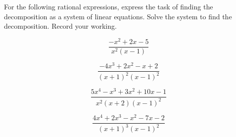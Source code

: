 \begin{reduce}
\begin{exercise}  
For the following rational expressions, express the task of finding the  decomposition as a system of linear equations.
Solve the system to find the decomposition.  
Record your working.
\begin{Parts}
\item 
\begin{equation*}
\frac{-x^2+2x-5}{x^2(x-1)}
\end{equation*}

\item 
\begin{equation*}
\frac{-4x^3+2x^2-x+2}{(x+1)^2(x-1)^2}
\end{equation*}

\item 
\begin{equation*}
\frac{5x^4-x^3+3x^2+10x-1}{x^2(x+2)(x-1)^2}
\end{equation*}


\item 
\begin{equation*}
\frac{4x^4+2x^3-x^2-7x-2}{(x+1)^3(x-1)^2}
\end{equation*}

\end{Parts}
\end{exercise}
\end{reduce}





